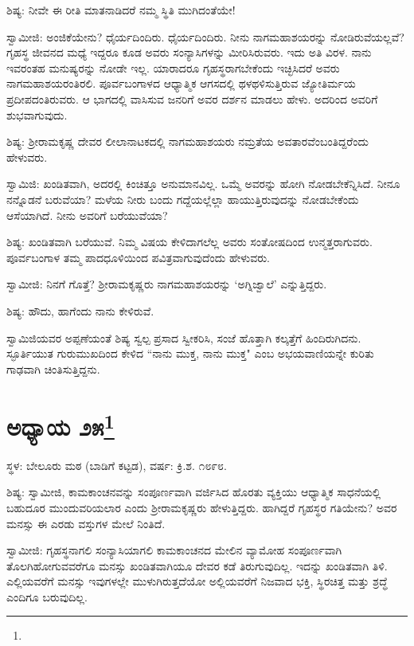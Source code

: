 ಶಿಷ್ಯ: ನೀವೇ ಈ ರೀತಿ ಮಾತನಾಡಿದರೆ ನಮ್ಮ ಸ್ಥಿತಿ ಮುಗಿದಂತೆಯೇ!

ಸ್ವಾಮೀಜಿ: ಅಂಜಿಕೆಯೇನು? ಧೈರ್ಯದಿಂದಿರು. ಧೈರ್ಯದಿಂದಿರು. ನೀನು ನಾಗಮಹಾಶಯರನ್ನು ನೋಡಿರುವೆಯಲ್ಲವೆ? ಗೃಹಸ್ಥ ಜೀವನದ ಮಧ್ಯೆ ಇದ್ದರೂ ಕೂಡ ಅವರು ಸಂನ್ಯಾಸಿಗಳನ್ನು ಮೀರಿಸಿರುವರು. ಇದು ಅತಿ ವಿರಳ. ನಾನು ಇವರಂತಹ ಮನುಷ್ಯರನ್ನು ನೋಡೇ ಇಲ್ಲ. ಯಾರಾದರೂ ಗೃಹಸ್ಥರಾಗಬೇಕೆಂದು ಇಚ್ಛಿಸಿದರೆ ಅವರು ನಾಗಮಹಾಶಯರಂತಿರಲಿ. ಪೂರ್ವಬಂಗಾಳದ ಆಧ್ಯಾತ್ಮಿಕ ಆಗಸದಲ್ಲಿ ಥಳಥಳಿಸುತ್ತಿರುವ ಜ್ಯೋತಿರ್ಮಯ ಪ್ರದೀಪದಂತಿರುವರು. ಆ ಭಾಗದಲ್ಲಿ ವಾಸಿಸುವ ಜನರಿಗೆ ಅವರ ದರ್ಶನ ಮಾಡಲು ಹೇಳು. ಅದರಿಂದ ಅವರಿಗೆ ಶುಭವಾಗುವುದು.

ಶಿಷ್ಯ: ಶ‍್ರೀರಾಮಕೃಷ್ಣ ದೇವರ ಲೀಲಾನಾಟಕದಲ್ಲಿ ನಾಗಮಹಾಶಯರು ನಮ್ರತೆಯ ಅವತಾರವೆಂಬಂತಿದ್ದರೆಂದು ಹೇಳುವರು.

ಸ್ವಾಮಿಜಿ: ಖಂಡಿತವಾಗಿ, ಅದರಲ್ಲಿ ಕಿಂಚಿತ್ತೂ ಅನುಮಾನವಿಲ್ಲ. ಒಮ್ಮೆ ಅವರನ್ನು ಹೋಗಿ ನೋಡಬೇಕೆನ್ನಿಸಿದೆ. ನೀನೂ ನನ್ನೊಡನೆ ಬರುವೆಯಾ? ಮಳೆಯ ನೀರು ಬಂದು ಗದ್ದೆಯಲ್ಲೆಲ್ಲಾ ಹಾಯುತ್ತಿರುವುದನ್ನು ನೋಡಬೇಕೆಂದು ಆಸೆಯಾಗಿದೆ. ನೀನು ಅವರಿಗೆ ಬರೆಯುವೆಯಾ?

ಶಿಷ್ಯ: ಖಂಡಿತವಾಗಿ ಬರೆಯುವೆ. ನಿಮ್ಮ ವಿಷಯ ಕೇಳಿದಾಗಲೆಲ್ಲ ಅವರು ಸಂತೋಷದಿಂದ ಉನ್ಮತ್ತರಾಗುವರು. ಪೂರ್ವಬಂಗಾಳ ತಮ್ಮ ಪಾದಧೂಳಿಯಿಂದ ಪವಿತ್ರವಾಗುವುದೆಂದು ಹೇಳುವರು.

ಸ್ವಾಮೀಜಿ: ನಿನಗೆ ಗೊತ್ತೆ? ಶ‍್ರೀರಾಮಕೃಷ್ಣರು ನಾಗಮಹಾಶಯರನ್ನು ‘ಅಗ್ನಿಜ್ವಾಲೆ’ ಎನ್ನುತ್ತಿದ್ದರು.

ಶಿಷ್ಯ: ಹೌದು, ಹಾಗೆಂದು ನಾನು ಕೇಳಿರುವೆ.

ಸ್ವಾಮಿಜಿಯವರ ಅಪ್ಪಣೆಯಂತೆ ಶಿಷ್ಯ ಸ್ವಲ್ಪ ಪ್ರಸಾದ ಸ್ವೀಕರಿಸಿ, ಸಂಜೆ ಹೊತ್ತಾಗಿ ಕಲ್ಕತ್ತೆಗೆ ಹಿಂದಿರುಗಿದನು. ಸ್ಫೂರ್ತಿಯುತ ಗುರುಮುಖದಿಂದ ಕೇಳಿದ “ನಾನು ಮುಕ್ತ, ನಾನು ಮುಕ್ತ" ಎಂಬ ಅಭಯವಾಣಿಯನ್ನೇ ಕುರಿತು ಗಾಢವಾಗಿ ಚಿಂತಿಸುತ್ತಿದ್ದನು.

\newpage

\chapter[ಅಧ್ಯಾಯ ೨೫]{ಅಧ್ಯಾಯ ೨೫\protect\footnote{}}

\begin{center}
ಸ್ಥಳ: ಬೇಲೂರು ಮಠ (ಬಾಡಿಗೆ ಕಟ್ಟಡ), ವರ್ಷ: ಕ್ರಿ.ಶ. ೧೮೯೮.
\end{center}

ಶಿಷ್ಯ: ಸ್ವಾಮೀಜಿ, ಕಾಮಕಾಂಚನವನ್ನು ಸಂಪೂರ್ಣವಾಗಿ ವರ್ಜಿಸಿದ ಹೊರತು ವ್ಯಕ್ತಿಯು ಆಧ್ಯಾತ್ಮಿಕ ಸಾಧನೆಯಲ್ಲಿ ಬಹುದೂರ ಮುಂದುವರಿಯಲಾರ ಎಂದು ಶ‍್ರೀರಾಮಕೃಷ್ಣರು ಹೇಳುತ್ತಿದ್ದರು. ಹಾಗಿದ್ದರೆ ಗೃಹಸ್ಥರ ಗತಿಯೇನು? ಅವರ ಮನಸ್ಸು ಈ ಎರಡು ವಸ್ತುಗಳ ಮೇಲೆ ನಿಂತಿದೆ.

ಸ್ವಾಮೀಜಿ: ಗೃಹಸ್ಥನಾಗಲಿ ಸಂನ್ಯಾಸಿಯಾಗಲಿ ಕಾಮಕಾಂಚನದ ಮೇಲಿನ ವ್ಯಾಮೋಹ ಸಂಪೂರ್ಣವಾಗಿ ತೊಲಗಿಹೋಗುವವರೆಗೂ ಮನಸ್ಸು ಖಂಡಿತವಾಗಿಯೂ ದೇವರ ಕಡೆ ತಿರುಗುವುದಿಲ್ಲ. ಇದನ್ನು ಖಂಡಿತವಾಗಿ ತಿಳಿ. ಎಲ್ಲಿಯವರೆಗೆ ಮನಸ್ಸು ಇವುಗಳಲ್ಲೇ ಮುಳುಗಿರುತ್ತದೆಯೋ ಅಲ್ಲಿಯವರೆಗೆ ನಿಜವಾದ ಭಕ್ತಿ, ಸ್ಥಿರಚಿತ್ತ ಮತ್ತು ಶ್ರದ್ಧೆ ಎಂದಿಗೂ ಬರುವುದಿಲ್ಲ.

